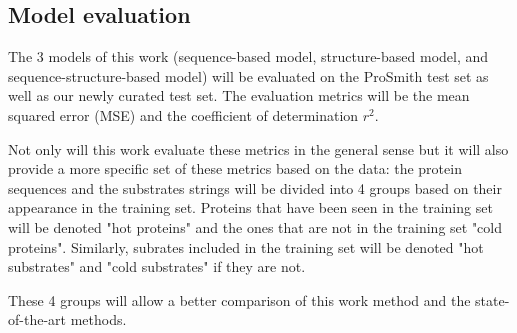 \subsection{Model evaluation}
The 3 models of this work (sequence-based model, structure-based model, and sequence-structure-based model) will be evaluated on the ProSmith test set as well as our newly curated test set. The evaluation metrics will be the mean squared error (MSE) and the coefficient of determination $r^2$.

Not only will this work evaluate these metrics in the general sense but it will also provide a more specific set of these metrics based on the data: the protein sequences and the substrates strings will be divided into 4 groups based on their appearance in the training set. Proteins that have been seen in the training set will be denoted "hot proteins" and the ones that are not in the training set "cold proteins". Similarly, subrates included in the training set will be denoted "hot substrates" and "cold substrates" if they are not.

These 4 groups will allow a better comparison of this work method and the state-of-the-art methods.